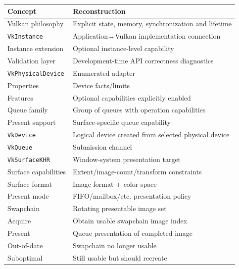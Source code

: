 {\def\LTcaptype{none} %
\begin{longtable}[]{@{}
  >{\raggedright\arraybackslash}p{}
  >{\raggedright\arraybackslash}p{}@{}}
\toprule\noalign{}
\begin{minipage}[b]{\linewidth}\raggedright
Concept
\end{minipage} & \begin{minipage}[b]{\linewidth}\raggedright
Reconstruction
\end{minipage} \\
\midrule\noalign{}
\endhead
\bottomrule\noalign{}
\endlastfoot
Vulkan philosophy & Explicit state, memory, synchronization and lifetime \\
\texttt{VkInstance} & Application↔Vulkan implementation connection \\
Instance extension & Optional instance-level capability \\
Validation layer & Development-time API correctness diagnostics \\
\texttt{VkPhysicalDevice} & Enumerated adapter \\
Properties & Device facts/limits \\
Features & Optional capabilities explicitly enabled \\
Queue family & Group of queues with operation capabilities \\
Present support & Surface-specific queue capability \\
\texttt{VkDevice} & Logical device created from selected physical device \\
\texttt{VkQueue} & Submission channel \\
\texttt{VkSurfaceKHR} & Window-system presentation target \\
Surface capabilities & Extent/image-count/transform constraints \\
Surface format & Image format + color space \\
Present mode & FIFO/mailbox/etc. presentation policy \\
Swapchain & Rotating presentable image set \\
Acquire & Obtain usable swapchain image index \\
Present & Queue presentation of completed image \\
Out-of-date & Swapchain no longer usable \\
Suboptimal & Still usable but should recreate \\

\end{longtable}}
